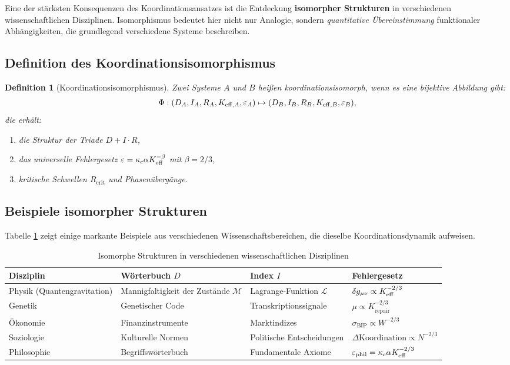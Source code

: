 \documentclass[12pt,a4paper]{article}
\newcommand{\kappac}{\kappa_c}
\newcommand{\eps}{\varepsilon}
\newcommand{\betaf}{\beta}
\newcommand{\Rcrit}{R_{\mathrm{crit}}}
\newtheorem{definition}{Definition}[section]
\begin{document}
	Eine der stärksten Konsequenzen des Koordinationsansatzes ist die Entdeckung \textbf{isomorpher Strukturen} in verschiedenen wissenschaftlichen Disziplinen. Isomorphismus bedeutet hier nicht nur Analogie, sondern \emph{quantitative Übereinstimmung} funktionaler Abhängigkeiten, die grundlegend verschiedene Systeme beschreiben.
	
	\subsection{Definition des Koordinationsisomorphismus}
	
	\begin{definition}[Koordinationsisomorphismus]
		Zwei Systeme \(A\) und \(B\) heißen koordinationsisomorph, wenn es eine bijektive Abbildung gibt:
		\[
		\Phi: (D_A, I_A, R_A, \Keff[A], \eps_A) \mapsto (D_B, I_B, R_B, \Keff[B], \eps_B),
		\]
		die erhält:
		\begin{enumerate}
			\item die Struktur der Triade \(D+I\cdot R\),
			\item das universelle Fehlergesetz \(\eps = \kappac \alpha \Keff^{-\betaf}\) mit \(\betaf = 2/3\),
			\item kritische Schwellen \(\Rcrit\) und Phasenübergänge.
		\end{enumerate}
	\end{definition}
	
	\subsection{Beispiele isomorpher Strukturen}
	
	Tabelle \ref{tab:isomorphisms} zeigt einige markante Beispiele aus verschiedenen Wissenschaftsbereichen, die dieselbe Koordinationsdynamik aufweisen.
	
	\begin{table}[H]
		\centering
		\caption{Isomorphe Strukturen in verschiedenen wissenschaftlichen Disziplinen}
		\label{tab:isomorphisms}
		\footnotesize
		\begin{tabular}{p{2.8cm}p{3cm}p{3cm}p{3.5cm}}
			\toprule
			\textbf{Disziplin} & \textbf{Wörterbuch \(D\)} & \textbf{Index \(I\)} & \textbf{Fehlergesetz} \\
			\midrule
			Physik (Quantengravitation) & Mannigfaltigkeit der Zustände \(\mathcal{M}\) & Lagrange-Funktion \(\mathcal{L}\) & \(\delta g_{\mu\nu} \propto \Keff^{-2/3}\) \\
			Genetik & Genetischer Code & Transkriptionssignale & \(\mu \propto K_{\mathrm{repair}}^{-2/3}\) \\
			Ökonomie & Finanzinstrumente & Marktindizes & \(\sigma_{\mathrm{BIP}} \propto W^{-2/3}\) \\
			Soziologie & Kulturelle Normen & Politische Entscheidungen & \(\Delta \text{Koordination} \propto N^{-2/3}\) \\
			Philosophie & Begriffswörterbuch & Fundamentale Axiome & \(\eps_{\text{phil}} = \kappac \alpha \Keff^{-2/3}\) \\
			\bottomrule
		\end{tabular}
	\end{table}
	
\end{document}
